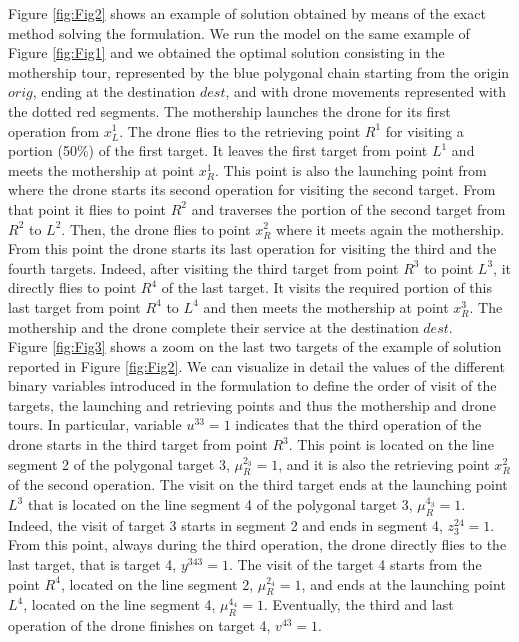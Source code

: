 \documentclass{itor}
\theoremstyle{definition}
\theoremstyle{remark}
\begin{document}
Figure \ref{fig:Fig2} shows an example of solution obtained by means of the exact method solving the formulation. We run the model on the same example of Figure \ref{fig:Fig1} and we obtained the optimal solution consisting in the mothership tour, represented by the blue polygonal chain starting from the origin $orig$, ending at the destination $dest$, and with drone movements represented with the dotted red segments. The mothership launches the drone for its first operation from $x_L^1$. The drone flies to the retrieving point $R^1$ for visiting a portion (50\%) of the first target. It leaves the first target from point $L^1$ and meets the mothership at point $x_R^1$. This point is also the launching point from where the drone starts its second operation for visiting the second target. From that point it flies to point $R^2$ and traverses the portion of the second target from $R^2$ to $L^2$. Then, the drone flies to point $x_R^2$ where it meets again the mothership. From this point the drone starts its last operation for visiting the third and the fourth targets. Indeed, after visiting the third target from point $R^3$ to point $L^3$, it directly flies to point $R^4$ of the last target. It visits the required portion of this last target from point $R^4$ to $L^4$ and then meets the mothership at point $x_R^3$. The mothership and the drone complete their service at the destination $dest$.\\
Figure \ref{fig:Fig3} shows a zoom on the last two targets of the example of solution reported in Figure \ref{fig:Fig2}. We can visualize in detail the values of the different binary variables introduced in the formulation to define the order of visit of the targets, the launching and retrieving points and thus the mothership and drone tours. In particular, variable $u^{33}=1$ indicates that the third operation of the drone starts in the third target from point $R^3$. This point is located on the line segment 2 of the polygonal target 3, $\mu_R^{2_3}=1$, and it is also the retrieving point $x_R^2$ of the second operation. The visit on the third target ends at the launching point $L^3$ that is located on the line segment 4 of the polygonal target 3, $\mu_R^{4_3}=1$. Indeed, the visit of target 3 starts in segment 2 and ends in segment 4, $z_3^{24}=1$. From this point, always during the third operation, the drone directly flies to the last target, that is target 4, $y^{343}=1$. The visit of the target 4 starts from the point $R^4$, located on the line segment 2, $\mu_R^{2_4}=1$, and ends at the launching point $L^4$, located on the line segment 4, $\mu_R^{4_4}=1$. Eventually, the third and last operation of the drone finishes on target 4, $v^{43}=1$.
\end{document}
